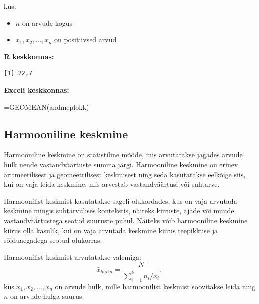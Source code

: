 \documentclass[
]{book}
\newenvironment{Shaded}{\begin{snugshade}}{\end{snugshade}}
\newcommand{\CommentTok}[1]{\textcolor[rgb]{0.56,0.35,0.01}{\textit{#1}}}
\newcommand{\FunctionTok}[1]{\textcolor[rgb]{0.13,0.29,0.53}{\textbf{#1}}}
\newcommand{\NormalTok}[1]{#1}
\newcommand{\SpecialCharTok}[1]{\textcolor[rgb]{0.81,0.36,0.00}{\textbf{#1}}}
\providecommand{\tightlist}{%
  \setlength{\itemsep}{0pt}\setlength{\parskip}{0pt}}
\renewenvironment{Shaded} {\begin{snugshade}\footnotesize} {\end{snugshade}}
\theoremstyle{definition}
\theoremstyle{definition}
\theoremstyle{definition}
\theoremstyle{definition}
\theoremstyle{remark}
\begin{document}
kus:

\begin{itemize}
\tightlist
\item
  \(n\) on arvude kogus
\item
  \(x_1, x_2, \ldots, x_n\) on positiivsed arvud
\end{itemize}

\textbf{R keskkonnas:}

\begin{Shaded}
\end{Shaded}

\begin{verbatim}
[1] 22,7
\end{verbatim}

\textbf{Exceli keskkonnas:}

\begin{naideExcel}
=GEOMEAN(andmeplokk)

\end{naideExcel}

\subsection{Harmooniline keskmine}\label{harmooniline-keskmine}

Harmooniline keskmine on statistiline mõõde, mis arvutatakse jagades arvude hulk nende vastandväärtuste summa järgi. Harmooniline keskmine on erinev aritmeetilisest ja geomeetrilisest keskmisest ning seda kasutatakse eelkõige siis, kui on vaja leida keskmine, mis arvestab vastandväärtusi või suhtarve.

Harmoonilist keskmist kasutatakse sageli olukordades, kus on vaja arvutada keskmine mingis suhtarvulises kontekstis, näiteks kiiruste, ajade või muude vastandväärtustega seotud suuruste puhul. Näiteks võib harmooniline keskmine kiirus olla kasulik, kui on vaja arvutada keskmine kiirus teepikkuse ja sõiduaegadega seotud olukorras.

Harmoonilist keskmist arvutatakse valemiga:
\[\bar x_{harm} = \frac{N}{\sum_{i=1}^k n_i / x_i},\]
kus \(x_{1}, x_{2}, \ldots, x_{n}\) on arvude hulk, mille harmoonilist keskmist soovitakse leida ning \(n\) on arvude hulga suurus.
\end{document}
